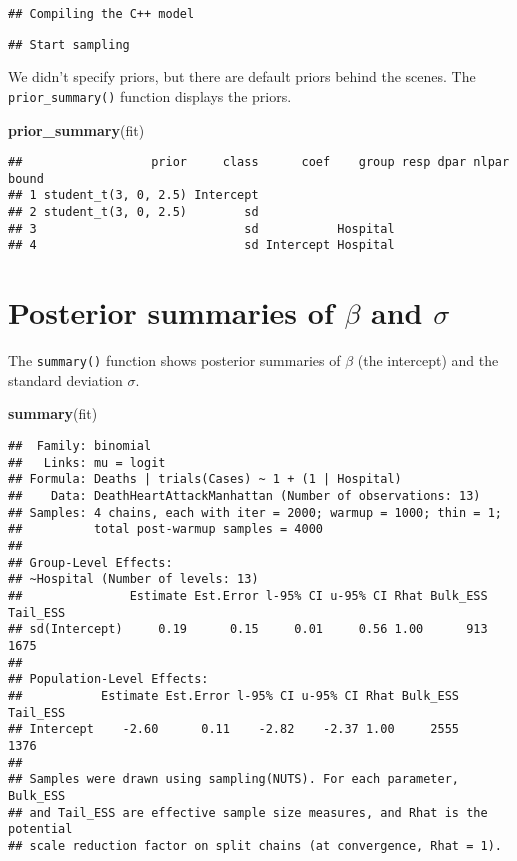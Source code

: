 \documentclass[
]{book}
\newenvironment{Shaded}{\begin{snugshade}}{\end{snugshade}}
\newcommand{\KeywordTok}[1]{\textcolor[rgb]{0.13,0.29,0.53}{\textbf{#1}}}
\newcommand{\NormalTok}[1]{#1}
\begin{document}
\begin{verbatim}
## Compiling the C++ model
\end{verbatim}

\begin{verbatim}
## Start sampling
\end{verbatim}

We didn't specify priors, but there are default priors behind the scenes. The \texttt{prior\_summary()} function displays the priors.

\begin{Shaded}
\begin{Highlighting}[]
\KeywordTok{prior_summary}\NormalTok{(fit)}
\end{Highlighting}
\end{Shaded}

\begin{verbatim}
##                  prior     class      coef    group resp dpar nlpar bound
## 1 student_t(3, 0, 2.5) Intercept                                         
## 2 student_t(3, 0, 2.5)        sd                                         
## 3                             sd           Hospital                      
## 4                             sd Intercept Hospital
\end{verbatim}

\hypertarget{posterior-summaries-of-beta-and-sigma}{%
\section{\texorpdfstring{Posterior summaries of \(\beta\) and \(\sigma\)}{Posterior summaries of \textbackslash beta and \textbackslash sigma}}\label{posterior-summaries-of-beta-and-sigma}}

The \texttt{summary()} function shows posterior summaries of \(\beta\) (the intercept) and the standard deviation \(\sigma\).

\begin{Shaded}
\begin{Highlighting}[]
\KeywordTok{summary}\NormalTok{(fit)}
\end{Highlighting}
\end{Shaded}

\begin{verbatim}
##  Family: binomial 
##   Links: mu = logit 
## Formula: Deaths | trials(Cases) ~ 1 + (1 | Hospital) 
##    Data: DeathHeartAttackManhattan (Number of observations: 13) 
## Samples: 4 chains, each with iter = 2000; warmup = 1000; thin = 1;
##          total post-warmup samples = 4000
## 
## Group-Level Effects: 
## ~Hospital (Number of levels: 13) 
##               Estimate Est.Error l-95% CI u-95% CI Rhat Bulk_ESS Tail_ESS
## sd(Intercept)     0.19      0.15     0.01     0.56 1.00      913     1675
## 
## Population-Level Effects: 
##           Estimate Est.Error l-95% CI u-95% CI Rhat Bulk_ESS Tail_ESS
## Intercept    -2.60      0.11    -2.82    -2.37 1.00     2555     1376
## 
## Samples were drawn using sampling(NUTS). For each parameter, Bulk_ESS
## and Tail_ESS are effective sample size measures, and Rhat is the potential
## scale reduction factor on split chains (at convergence, Rhat = 1).
\end{verbatim}
\end{document}
